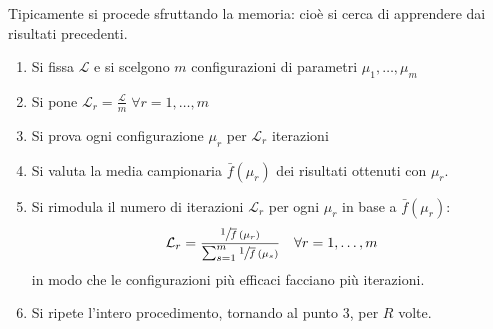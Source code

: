 \documentclass[\main/main.tex]{subfiles}
\begin{document}
\begin{observation}
    Tipicamente si procede sfruttando la memoria: cioè si cerca di apprendere dai risultati precedenti.
    \begin{enumerate}
        \item Si fissa \(\mathcal{L}\) e si scelgono \(m\) configurazioni di parametri \(\mu_1, \ldots, \mu_m\)
        \item Si pone \(\mathcal{L}_r = \frac{\mathcal{L}}{m} \; \forall r = 1, \ldots, m\)
        \item Si prova ogni configurazione \(\mu_r\) per \(\mathcal{L}_r\) iterazioni
        \item Si valuta la media campionaria \(\bar{f}(\mu_r)\) dei risultati ottenuti con \(\mu_r\).
        \item Si rimodula il numero di iterazioni \(\mathcal{L}_r\) per ogni \(\mu_r\) in base a \(\bar{f}(\mu_r)\):
        \[
            \mathcal{L}_r = \frac{\sfrac{1}{\overline{f}\left(\mu_r\right)}}{\sum_{s=1}^m \sfrac{1}{\overline{f}\left(\mu_s\right)}} \quad \forall r = 1, \ldots, m
        \]
        in modo che le configurazioni più efficaci facciano più iterazioni.
        \item Si ripete l'intero procedimento, tornando al punto 3, per \(R\) volte.
    \end{enumerate}
\end{observation}
\clearpage
\end{document}
